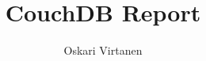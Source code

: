 \documentclass[12pt,a4paper,finnish,oneside]{article}
\begin{document}



\pagestyle{plain}

\author{Oskari Virtanen}

\title{CouchDB Report}

\DATE{\today}
\maketitle             %


\setcounter{page}{2}    %

\newpage                       %


\tableofcontents

\clearpage                     %

%







\newpage
{}  %



\end{document}
